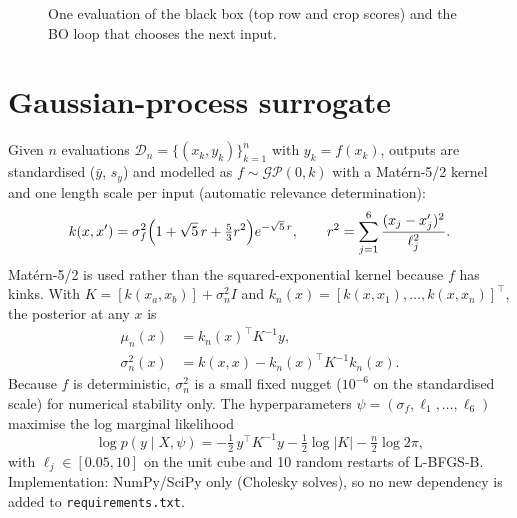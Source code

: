 \documentclass[11pt,a4paper]{article}
\numberwithin{equation}{section}
\newcommand{\Fd}{F_4}
\begin{document}
\begin{figure}[h]\centering
{}
\caption{One evaluation of the black box (top row and crop scores) and the BO loop that chooses the next input.}
\end{figure}

\section{Gaussian-process surrogate}
Given $n$ evaluations $\mathcal D_n=\{(x_k,y_k)\}_{k=1}^{n}$ with $y_k=f(x_k)$, outputs are standardised
($\bar y$, $s_y$) and modelled as $f\sim\mathcal{GP}(0,k)$ with a Mat\'ern-5/2 kernel and one length scale per
input (automatic relevance determination):
\begin{equation}
k(x,x')=\sigma_f^2\Bigl(1+\sqrt5\,r+\tfrac53 r^2\Bigr)e^{-\sqrt5\,r},\qquad
r^2=\sum_{j=1}^{6}\frac{(x_j-x'_j)^2}{\ell_j^2}.
\end{equation}
Mat\'ern-5/2 is used rather than the squared-exponential kernel because $f$ has kinks. With
$K=[k(x_a,x_b)]+\sigma_n^2 I$ and $k_n(x)=[k(x,x_1),\dots,k(x,x_n)]^\top$, the posterior at any $x$ is
\begin{align}
\mu_n(x)&=k_n(x)^\top K^{-1}y,\label{eq:mu}\\
\sigma_n^2(x)&=k(x,x)-k_n(x)^\top K^{-1}k_n(x).\label{eq:sigma}
\end{align}
Because $f$ is deterministic, $\sigma_n^2$ is a small fixed nugget ($10^{-6}$ on the standardised scale) for
numerical stability only. The hyperparameters $\psi=(\sigma_f,\ell_1,\dots,\ell_6)$ maximise the log marginal
likelihood
\begin{equation}
\log p(y\mid X,\psi)=-\tfrac12\,y^\top K^{-1}y-\tfrac12\log|K|-\tfrac n2\log 2\pi,
\end{equation}
with $\ell_j\in[0.05,10]$ on the unit cube and 10 random restarts of L-BFGS-B. Implementation: NumPy/SciPy only
(Cholesky solves), so no new dependency is added to \texttt{requirements.txt}.
\end{document}
